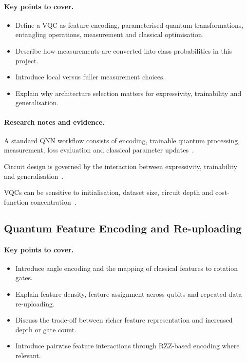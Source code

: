 \documentclass[]{UCD_CS_MSc_AAI_Report}
\newcommand{\challenge}[1]{{\color{red}#1}}
\newcommand{\method}[1]{{\color{cyan!80!black}#1}}
\newcommand{\theory}[1]{{\color{gray}#1}}
\newcommand{\sectionbrief}{\paragraph{Key points to cover.}}
\newcommand{\researchnotes}{\paragraph{Research notes and evidence.}}
\begin{document}
\sectionbrief
\begin{itemize}
    \item Define a VQC as feature encoding, parameterised quantum transformations, entangling operations, measurement and classical optimisation.
    \item Describe how measurements are converted into class probabilities in this project.
    \item Introduce local versus fuller measurement choices.
    \item Explain why architecture selection matters for expressivity, trainability and generalisation.
\end{itemize}

\researchnotes
\begin{itemize}
    \method{\item A standard QNN workflow consists of encoding, trainable quantum processing, measurement, loss evaluation and classical parameter updates~\cite{du_quantum_2025}.}
    \theory{\item Circuit design is governed by the interaction between expressivity, trainability and generalisation~\cite{du_quantum_2025}.}
    \challenge{\item VQCs can be sensitive to initialisation, dataset size, circuit depth and cost-function concentration~\cite{vasan_exploring_2025,friedrich_quantum_2025}.}
\end{itemize}

\subsection{Quantum Feature Encoding and Re-uploading}

\sectionbrief
\begin{itemize}
    \item Introduce angle encoding and the mapping of classical features to rotation gates.
    \item Explain feature density, feature assignment across qubits and repeated data re-uploading.
    \item Discuss the trade-off between richer feature representation and increased depth or gate count.
    \item Introduce pairwise feature interactions through RZZ-based encoding where relevant.
\end{itemize}
\end{document}
